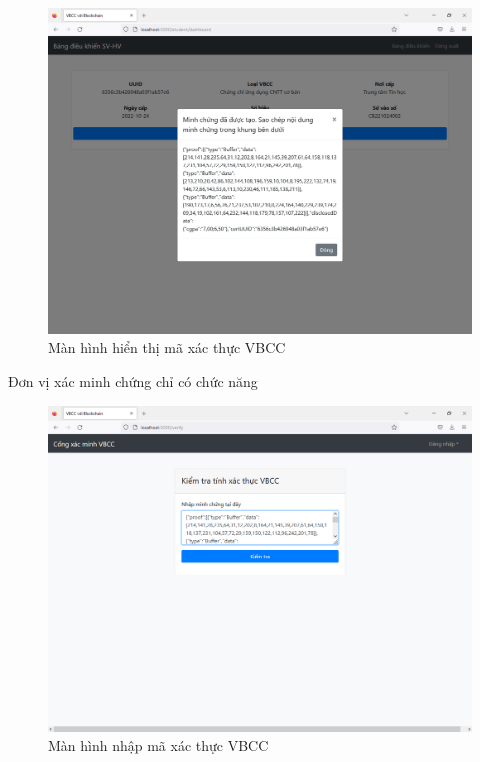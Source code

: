 \begin{figure}[H]
\centering
\includegraphics[width=.9\linewidth]{img/sv_minhchung.PNG}
\caption{Màn hình hiển thị mã xác thực VBCC}
\label{fig:sv_minhchung}
\end{figure}

Đơn vị xác minh chứng chỉ có chức năng

\begin{figure}[H]
\centering
\includegraphics[width=.9\linewidth]{img/v_begin.PNG}
\caption{Màn hình nhập mã xác thực VBCC}
\label{fig:v_begin}
\end{figure}


